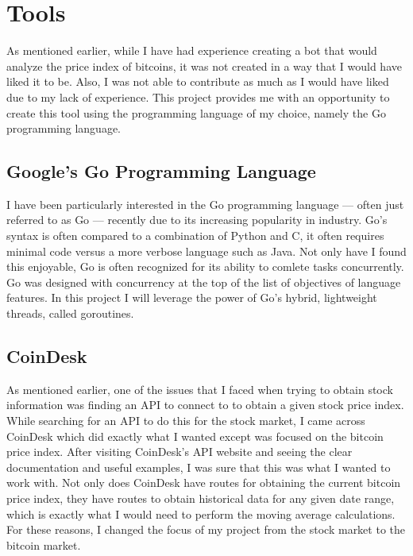 \section{Tools}

As mentioned earlier, while I have had experience creating a bot that would analyze the price index
of bitcoins, it was not created in a way that I would have liked it to be. Also, I was not able to
contribute as much as I would have liked due to my lack of experience. This project provides me with
an opportunity to create this tool using the programming language of my choice, namely the Go programming
language.

\subsection{Google's Go Programming Language}

I have been particularly interested in the Go programming language --- often just referred to as Go ---
recently due to its increasing popularity in industry. Go's syntax is often compared to a combination
of Python and C, it often requires minimal code versus a more verbose language such as Java. Not only
have I found this enjoyable, Go is often recognized for its ability to comlete tasks concurrently.
Go was designed with concurrency at the top of the list of objectives of language features. In this
project I will leverage the power of Go's hybrid, lightweight threads, called goroutines.

\subsection{CoinDesk}

As mentioned earlier, one of the issues that I faced when trying to obtain stock information was finding
an API to connect to to obtain a given stock price index. While searching for an API to do this for
the stock market, I came across CoinDesk which did exactly what I wanted except was focused on the
bitcoin price index. After visiting CoinDesk's API website and seeing the clear documentation and
useful examples, I was sure that this was what I wanted to work with. Not only does CoinDesk have
routes for obtaining the current bitcoin price index, they have routes to obtain historical data
for any given date range, which is exactly what I would need to perform the moving average calculations.
For these reasons, I changed the focus of my project from the stock market to the bitcoin market.

